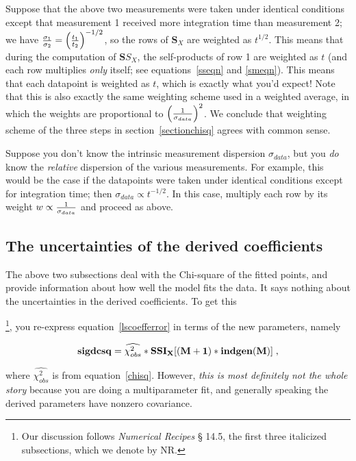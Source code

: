 {	Suppose that the above two measurements were taken under
identical conditions except that measurement 1 received more integration
time than measurement 2; we have ${\sigma_1 \over \sigma_2} = \left({t_1
\over t_2}\right)^{-1/2}$, so the rows of ${\mathbf S_X}$ are weighted
as $t^{1/2}$.  This means that during the computation of ${\mathbf
SS_X}$, the self-products of row 1 are weighted as $t$ (and each row
multiplies {\it only} itself; see equations~\ref{sseqn} and
\ref{smeqn}).  This means that each datapoint is weighted as $t$, which
is exactly what you'd expect! Note that this is also exactly the same
weighting scheme used in a weighted average, in which the weights are
proportional to $\left(1 \over \sigma_{data}\right)^2$.  We conclude
that weighting scheme of the three steps in section~\ref{sectionchisq}
agrees with common sense. 

	Suppose you don't know the intrinsic measurement dispersion
$\sigma_{data}$, but you {\it do} know the {\it relative} dispersion of
the various measurements.  For example, this would be the case if the
datapoints were taken under identical conditions except for integration
time; then $\sigma_{data} \propto t^{-1/2}$.  In this case, multiply
each row by its weight $w \propto {1 \over \sigma_{data}}$ and proceed
as above. 

\subsection{The uncertainties of the derived coefficients }
\label{chicoeffs}

	The above two subsections deal with the Chi-square of the fitted
points, and provide information about how well the model fits the data. 
It says nothing about the uncertainties in the derived coefficients.  To
get this{\footnote{Our discussion follows {\it Numerical Recipes} \S
14.5, the first three italicized subsections, which we denote by NR.},
you re-express equation~\ref{lscoefferror} in terms of the new
parameters, namely

\begin{equation}
\label{lscoefferror1}
{\bf sigdcsq} = \widehat{\chi_{obs}^2} * {\bf SSI_X[(M+1)*indgen(M)]} \; ,
\end{equation}

\noindent where $\widehat{\chi_{obs}^2}$ is from equation~\ref{chisq}. 
However, {\it this is most definitely not the whole story} because you
are doing a multiparameter fit, and generally speaking the derived
parameters have nonzero covariance. 

}}

